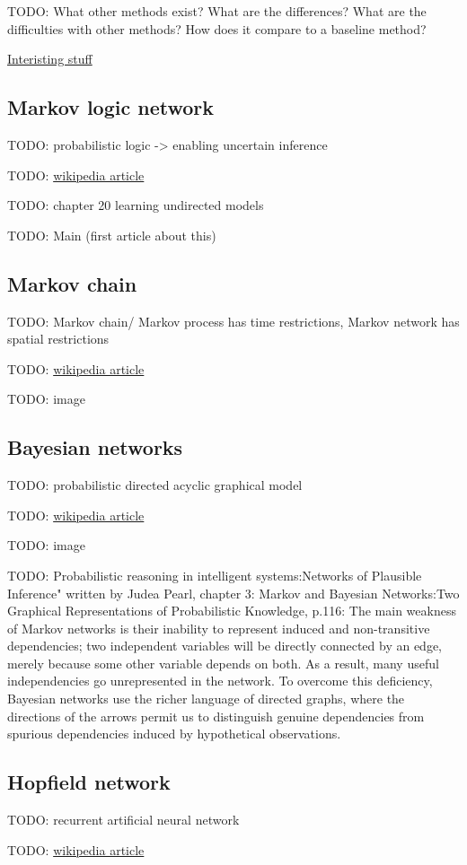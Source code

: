 TODO: What other methods exist? What are the differences? What are the difficulties with other methods? How does it compare to a baseline method?

\href{https://www.math.leidenuniv.nl/scripties/BSC-Obbens.pdf}{Interisting stuff} \cite{obbens2014inference}


\subsection{Markov logic network}

TODO: probabilistic logic -> enabling uncertain inference

TODO: \href{https://en.wikipedia.org/wiki/Markov_logic_network}{wikipedia article}

TODO: \cite{koller2009probabilistic} chapter 20 learning undirected models

TODO: Main (first article about this) \cite{richardson2006markov}

\subsection{Markov chain}

TODO: Markov chain/ Markov process has time restrictions, Markov network has spatial restrictions

TODO: \href{https://en.wikipedia.org/wiki/Markov_chain}{wikipedia article}

TODO: image


\subsection{Bayesian networks}

TODO: probabilistic directed acyclic graphical model

TODO: \href{https://en.wikipedia.org/wiki/Bayesian_network}{wikipedia article}

TODO: image

TODO: Probabilistic reasoning in intelligent systems:Networks of Plausible Inference" written by Judea Pearl, chapter 3: Markov and Bayesian Networks:Two Graphical Representations of Probabilistic Knowledge, p.116:
The main weakness of Markov networks is their inability to represent induced and non-transitive dependencies; two independent variables will be directly connected by an edge, merely because some other variable depends on both. As a result, many useful independencies go unrepresented in the network. To overcome this deficiency, Bayesian networks use the richer language of directed graphs, where the directions of the arrows permit us to distinguish genuine dependencies from spurious dependencies induced by hypothetical observations.


\subsection{Hopfield network}

TODO: recurrent artificial neural network

TODO: \href{https://en.wikipedia.org/wiki/Hopfield_network}{wikipedia article}

